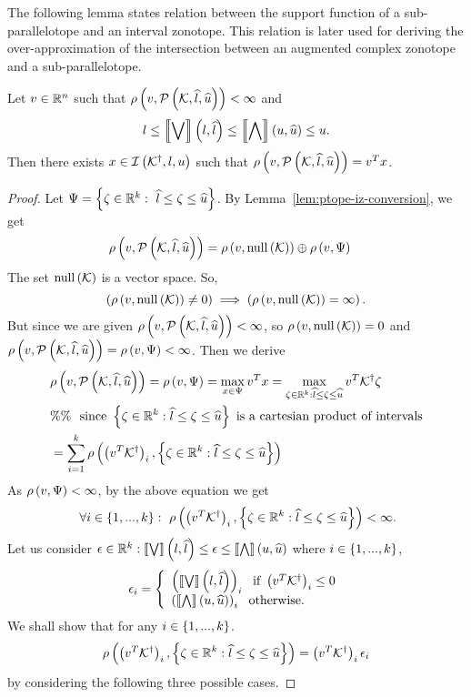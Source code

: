 %
The following lemma states relation between the support function of a
sub-parallelotope and an interval zonotope.  This relation
is later used for deriving the over-approximation of the intersection
between an augmented complex zonotope and a sub-parallelotope.
%
\begin{lemma}
Let $v\in\mathbb{R}^n$ such that
$\rho\left(v,\mathcal{P}\left(\mathcal{K},\widehat{l},\widehat{u}\right)\right)<\infty$ and
%
\[
l\leq\left\llbracket\bigvee\right\rrbracket\left(l,\widehat{l}\right)\leq\left\llbracket\bigwedge\right\rrbracket\left(u,\widehat{u}\right)\leq u.
\]
%
Then there exists $x\in\mathit{\operatorname{\mathcal{I}}}\left({\mathcal{K}}^\dagger,l,u\right)$ such that
$\rho\left(v,\mathcal{P}\left(\mathcal{K},\widehat{l},\widehat{u}\right)\right)=v^Tx$.
\end{lemma}
%
\begin{proof}
  Let $\Psi=\left\{\zeta\in\mathbb{R}^k:~\widehat{l}\leq\zeta\leq\widehat{u}\right\}$.  By
  Lemma~\ref{lem:ptope-iz-conversion}, we get
  \begin{align*}
  & \rho\left(v,\mathcal{P}\left(\mathcal{K},\widehat{l},\widehat{u}\right)\right)=\rho\left(v,\operatorname{null}\left(\mathcal{K}\right)\right)\oplus\rho\left(v,\Psi\right)
  \end{align*}
%
The set $\operatorname{null}\left(\mathcal{K}\right)$ is a vector space.  So,
%
\[
\left(\rho\left(v,\operatorname{null}\left(\mathcal{K}\right)\right)\neq 0\right)\implies
\left(\rho\left(v,\operatorname{null}\left(\mathcal{K}\right)\right)=\infty\right).
\]
%
But since we are given
$\rho\left(v,\mathcal{P}\left(\mathcal{K},\widehat{l},\widehat{u}\right)\right)<\infty$, so
$\rho\left(v,\operatorname{null}\left(\mathcal{K}\right)\right)=0$ and
$\rho\left(v,\mathcal{P}\left(\mathcal{K},\widehat{l},\widehat{u}\right)\right)=\rho\left(v,\Psi\right)<\infty$.  Then we derive
%
\begin{align}
& \rho\left(v,\mathcal{P}\left(\mathcal{K},\widehat{l},\widehat{u}\right)\right)=\rho\left(v,\Psi\right)=
\max_{x\in\Psi}v^Tx
=\max_{\zeta\in\mathbb{R}^k:\widehat{l}\leq\zeta\leq\widehat{u}}v^T{\mathcal{K}}^\dagger\zeta\nonumber\\
&
\%\%~~\text{since}~\left\{\zeta\in\mathbb{R}^k:\widehat{l}\leq\zeta\leq\widehat{u}\right\}~\text{is
a cartesian product of intervals}\nonumber\\
& =
\sum_{i=1}^k\rho\left(\left(v^T{\mathcal{K}}^\dagger\right)_i,\left\{\zeta\in\mathbb{R}^k:\widehat{l}\leq\zeta\leq\widehat{u}\right\}\right)~\label{eqn:proof-supp1}
\end{align}
%
As $\rho\left(v,\Psi\right)<\infty$, by the above equation we get
%
\begin{equation}~\label{eqn:proof-supp2}
\forall
i\in\left\{1,...,k\right\}:~\rho\left(\left(v^T{\mathcal{K}}^\dagger\right)_i,\left\{\zeta\in\mathbb{R}^k:\widehat{l}\leq\zeta\leq\widehat{u}\right\}\right)<\infty.
\end{equation}
%
Let us consider $\epsilon\in\mathbb{R}^k: \left\llbracket\bigvee\right\rrbracket\left(l,\widehat{l}\right)\leq \epsilon\leq \left\llbracket\bigwedge\right\rrbracket\left(u,\widehat{u}\right)$
where $i\in \left\{1,...,k\right\}$, 
%
\[
\epsilon_i=\left\{
\begin{array}{l}
  \left(\left\llbracket\bigvee\right\rrbracket\left(l,\widehat{l}\right)\right)_i~~\text{if}~\left(v^T{\mathcal{K}}^\dagger\right)_i\leq 0\\
  \left(\left\llbracket\bigwedge\right\rrbracket\left(u,\widehat{u}\right)\right)_i~~\text{otherwise}.
\end{array}
\right.
\]
%
We shall show that for any $i\in\left\{1,...,k\right\}$.
%
\[
\rho\left(\left(v^T{\mathcal{K}}^\dagger\right)_i,\left\{\zeta\in\mathbb{R}^k:\widehat{l}\leq\zeta\leq\widehat{u}\right\}\right)=\left(v^T{\mathcal{K}}^\dagger\right)_i\epsilon_i
\]
%
by considering the following three possible cases.


\end{proof}
